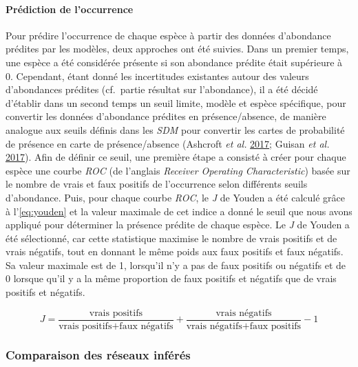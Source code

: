 \documentclass[12pt,]{article}
\begin{document}
\hypertarget{pruxe9diction-de-loccurrence}{%
\paragraph{Prédiction de
l'occurrence}\label{pruxe9diction-de-loccurrence}}

Pour prédire l'occurrence de chaque espèce à partir des données
d'abondance prédites par les modèles, deux approches ont été suivies.
Dans un premier temps, une espèce a été considérée présente si son
abondance prédite était supérieure à 0. Cependant, étant donné les
incertitudes existantes autour des valeurs d'abondances prédites
(cf.~partie résultat sur l'abondance), il a été décidé d'établir dans un
second temps un seuil limite, modèle et espèce spécifique, pour
convertir les données d'abondance prédites en présence/absence, de
manière analogue aux seuils définis dans les \emph{SDM} pour convertir
les cartes de probabilité de présence en carte de présence/absence
(Ashcroft \emph{et al.} \protect\hyperlink{ref-Ashcroft_2017}{2017};
Guisan \emph{et al.} \protect\hyperlink{ref-Guisan_2017}{2017}). Afin de
définir ce seuil, une première étape a consisté à créer pour chaque
espèce une courbe \emph{ROC} (de l'anglais \emph{Receiver Operating
Characteristic}) basée sur le nombre de vrais et faux positifs de
l'occurrence selon différents seuils d'abondance. Puis, pour chaque
courbe \emph{ROC}, le \emph{J} de Youden a été calculé grâce à
l'\cref{eq:youden} et la valeur maximale de cet indice a donné le seuil
que nous avons appliqué pour déterminer la présence prédite de chaque
espèce. Le \emph{J} de Youden a été sélectionné, car cette statistique
maximise le nombre de vrais positifs et de vrais négatifs, tout en
donnant le même poids aux faux positifs et faux négatifs. Sa valeur
maximale est de 1, lorsqu'il n'y a pas de faux positifs ou négatifs et
de 0 lorsque qu'il y a la même proportion de faux positifs et négatifs
que de vrais positifs et négatifs.

\begin{equation} J = \frac{\text{vrais positifs}}{\text{vrais positifs} + \text{faux négatifs}} + \frac{\text{vrais négatifs}}{\text{vrais négatifs} + \text{faux positifs}} - 1 \label{eq:youden}\end{equation}

\hypertarget{comparaison-des-ruxe9seaux-infuxe9ruxe9s}{%
\subsubsection{Comparaison des réseaux
inférés}\label{comparaison-des-ruxe9seaux-infuxe9ruxe9s}}
\end{document}
